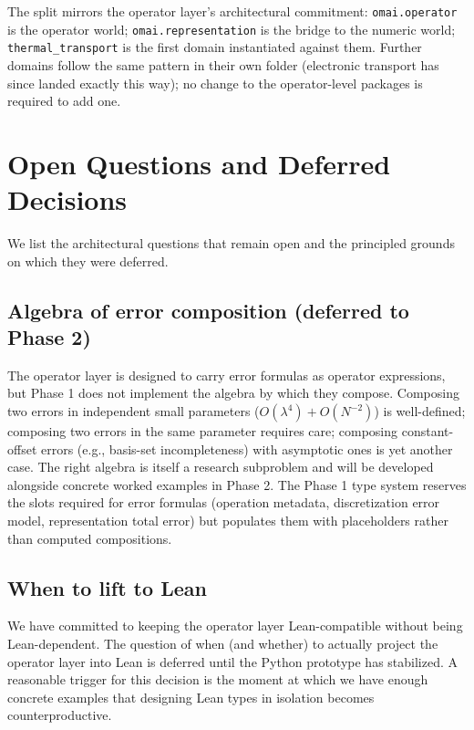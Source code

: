 \documentclass[11pt,a4paper]{article}
\begin{document}
\noindent The split mirrors the operator layer's architectural commitment: \texttt{omai.operator}
is the operator world; \texttt{omai.representation} is the bridge to the numeric world;
\texttt{thermal\_transport} is the first domain instantiated against them. Further
domains follow the same pattern in their own folder (electronic transport has
since landed exactly this way); no change to the operator-level packages is
required to add one.

\section{Open Questions and Deferred Decisions}
\label{sec:open}

We list the architectural questions that remain open and the principled grounds on which they
were deferred.

\subsection{Algebra of error composition (deferred to Phase 2)}

The operator layer is designed to carry error formulas as operator expressions, but Phase 1 does not
implement the algebra by which they compose. Composing two errors in independent small parameters
($O(\lambda^4) + O(N^{-2})$) is well-defined; composing two errors in the same parameter requires
care; composing constant-offset errors (e.g., basis-set incompleteness) with asymptotic ones is
yet another case. The right algebra is itself a research subproblem and will be developed
alongside concrete worked examples in Phase 2. The Phase 1 type system reserves the slots
required for error formulas (operation metadata, discretization error model, representation
total error) but populates them with placeholders rather than computed compositions.

\subsection{When to lift to Lean}

We have committed to keeping the operator layer Lean-compatible without being Lean-dependent. The
question of when (and whether) to actually project the operator layer into Lean is deferred until
the Python prototype has stabilized. A reasonable trigger for this decision is the moment at
which we have enough concrete examples that designing Lean types in isolation becomes
counterproductive.
\end{document}
